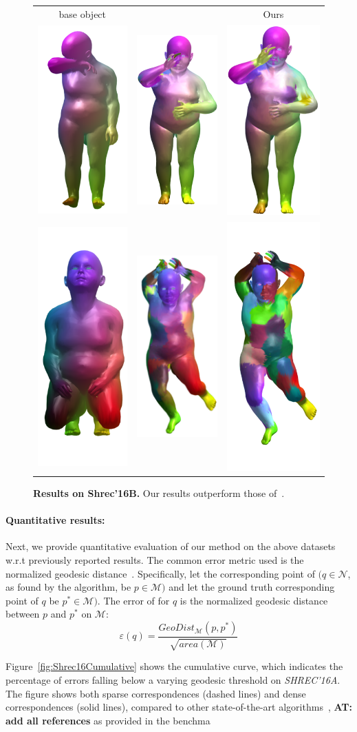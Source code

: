 \documentclass[10pt,twocolumn,letterpaper]{article}
\newcommand{\colornote}[3]{{\color{#1}\bf{#2: #3}\normalfont}}
\newcommand{\colornote}[3]{}
\newcommand {\ayellet}[1]{\colornote{blue}{AT}{#1}}
\begin{document}
\begin{figure}[htb]

	\centering
	\begin{tabular}{ccc}
	    base object & 
	    \cite{rodola2017partial} & 
	    Ours\\
	    	\includegraphics[scale=0.5]{figures/Top1Base.png} & \includegraphics[scale=0.5]{figures/Top1DDIS.png} & \includegraphics[scale=0.5]{figures/Top1PFM.png} \\ \includegraphics[scale=0.5]{figures/Top2Base.png} & \includegraphics[scale=0.5]{figures/Top2DDIS.png} & \includegraphics[scale=0.5]{figures/Top2PFM.png}
	\end{tabular}

	\caption{{\bf Results on Shrec'16B.} 
	Our results outperform those of~\cite{rodola2017partial}.}
	\label{fig:Shrec16TopImage}
\end{figure}



\paragraph{Quantitative results:}
Next, we provide quantitative evaluation of our method on the above datasets w.r.t previously reported results.
The common error metric used is the normalized geodesic distance~\cite{kim2011blended}.
Specifically, let the corresponding point of $(q \in \mathcal{N}$, as found by the algorithm, be $ p \in \mathcal{M})$ and let the ground truth corresponding point of $q$ be $p^* \in \mathcal{M})$. 
The error of for $q$ is the normalized geodesic distance between  $p$ and $p^*$ on $\mathcal{M}$:
\begin{equation}
\varepsilon(q)=\frac{GeoDist_{\mathcal{M}}(p,p^*)}{\sqrt{area(\mathcal{M})}}
\end{equation}

Figure~\ref{fig:Shrec16Cumulative} shows the cumulative curve, which indicates the percentage of errors falling below a varying geodesic threshold on {\em SHREC'16A}. 
The figure shows both sparse correspondences (dashed lines) and dense correspondences (solid lines), compared to other state-of-the-art algorithms~\cite{litany2017fully,rodola2017partial},
\ayellet{add all references}
as provided in the benchma
\end{document}
